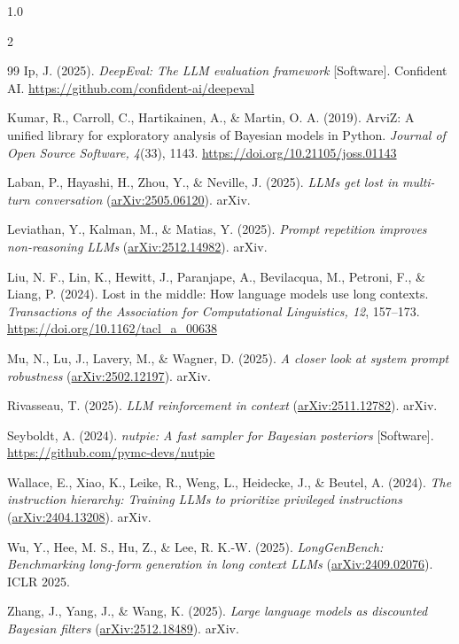 \documentclass[12pt]{article}
\begin{document}
\begin{spacing}{1.0}
\begin{multicols}{2}
\begin{thebibliography}{99}
 Ip, J. (2025). \emph{DeepEval: The LLM evaluation framework} [Software]. Confident AI. \url{https://github.com/confident-ai/deepeval}

 Kumar, R., Carroll, C., Hartikainen, A., \& Martin, O. A. (2019). ArviZ: A unified library for exploratory analysis of Bayesian models in Python. \emph{Journal of Open Source Software, 4}(33), 1143. \url{https://doi.org/10.21105/joss.01143}

 Laban, P., Hayashi, H., Zhou, Y., \& Neville, J. (2025). \emph{LLMs get lost in multi-turn conversation} (\href{https://arxiv.org/abs/2505.06120}{arXiv:2505.06120}). arXiv.

 Leviathan, Y., Kalman, M., \& Matias, Y. (2025). \emph{Prompt repetition improves non-reasoning LLMs} (\href{https://arxiv.org/abs/2512.14982}{arXiv:2512.14982}). arXiv.

 Liu, N. F., Lin, K., Hewitt, J., Paranjape, A., Bevilacqua, M., Petroni, F., \& Liang, P. (2024). Lost in the middle: How language models use long contexts. \emph{Transactions of the Association for Computational Linguistics, 12}, 157--173. \url{https://doi.org/10.1162/tacl_a_00638}

 Mu, N., Lu, J., Lavery, M., \& Wagner, D. (2025). \emph{A closer look at system prompt robustness} (\href{https://arxiv.org/abs/2502.12197}{arXiv:2502.12197}). arXiv.

 Rivasseau, T. (2025). \emph{LLM reinforcement in context} (\href{https://arxiv.org/abs/2511.12782}{arXiv:2511.12782}). arXiv.

 Seyboldt, A. (2024). \emph{nutpie: A fast sampler for Bayesian posteriors} [Software]. \url{https://github.com/pymc-devs/nutpie}

 Wallace, E., Xiao, K., Leike, R., Weng, L., Heidecke, J., \& Beutel, A. (2024). \emph{The instruction hierarchy: Training LLMs to prioritize privileged instructions} (\href{https://arxiv.org/abs/2404.13208}{arXiv:2404.13208}). arXiv.

 Wu, Y., Hee, M. S., Hu, Z., \& Lee, R. K.-W. (2025). \emph{LongGenBench: Benchmarking long-form generation in long context LLMs} (\href{https://arxiv.org/abs/2409.02076}{arXiv:2409.02076}). ICLR 2025.

 Zhang, J., Yang, J., \& Wang, K. (2025). \emph{Large language models as discounted Bayesian filters} (\href{https://arxiv.org/abs/2512.18489}{arXiv:2512.18489}). arXiv.

\end{thebibliography}
\end{multicols}
\end{spacing}
\end{document}
